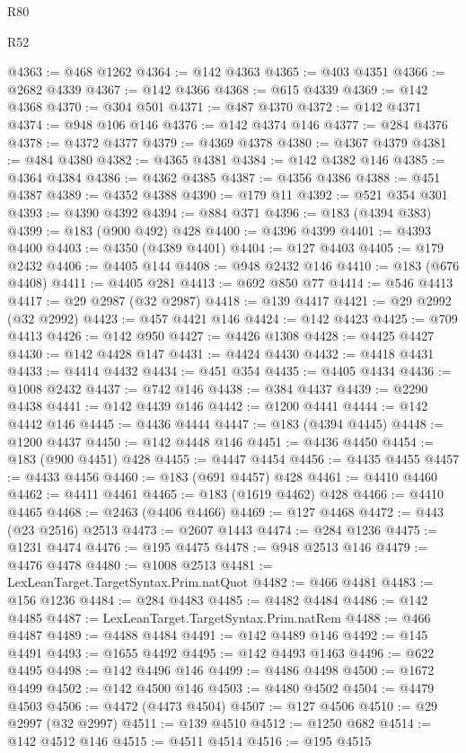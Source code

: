 \begin{lexlean}{R80}
\begin{lexlean}{R52}
\begin{coremodule}
{{{{{{{{{{{{{{{{{{{{{{{{{{{{{{{{{{{{{{{{{{{{{{{{{{{{{{{{{{{{{{{{{{{{{{{{{{{{{{{{{{{{{{{{{{{{{{{{{{{{{{{{{{{{{{{{{{{{{{{{{{{{{{{{{{{{{{{{{{{{{{{{{{{{{{{{{{{{{{{{{{{{{{{{{{{{{{{{{{{{{{{{{{{{{{{{{{{{{{@4363 := @468 @1262
@4364 := @142 @4363
@4365 := @403 @4351
@4366 := @2682 @4339
@4367 := @142 @4366
@4368 := @615 @4339
@4369 := @142 @4368
@4370 := @304 @501
@4371 := @487 @4370
@4372 := @142 @4371
@4374 := @948 @106 @146
@4376 := @142 @4374 @146
@4377 := @284 @4376
@4378 := @4372 @4377
@4379 := @4369 @4378
@4380 := @4367 @4379
@4381 := @484 @4380
@4382 := @4365 @4381
@4384 := @142 @4382 @146
@4385 := @4364 @4384
@4386 := @4362 @4385
@4387 := @4356 @4386
@4388 := @451 @4387
@4389 := @4352 @4388
@4390 := @179 @11
@4392 := @521 @354 @301
@4393 := @4390 @4392
@4394 := @884 @371
@4396 := @183 (@4394 @383)
@4399 := @183 (@900 @492) @428
@4400 := @4396 @4399
@4401 := @4393 @4400
@4403 := @4350 (@4389 @4401)
@4404 := @127 @4403
@4405 := @179 @2432
@4406 := @4405 @144
@4408 := @948 @2432 @146
@4410 := @183 (@676 @4408)
@4411 := @4405 @281
@4413 := @692 @850 @77
@4414 := @546 @4413
@4417 := @29 @2987 (@32 @2987)
@4418 := @139 @4417
@4421 := @29 @2992 (@32 @2992)
@4423 := @457 @4421 @146
@4424 := @142 @4423
@4425 := @709 @4413
@4426 := @142 @950
@4427 := @4426 @1308
@4428 := @4425 @4427
@4430 := @142 @4428 @147
@4431 := @4424 @4430
@4432 := @4418 @4431
@4433 := @4414 @4432
@4434 := @451 @354
@4435 := @4405 @4434
@4436 := @1008 @2432
@4437 := @742 @146
@4438 := @384 @4437
@4439 := @2290 @4438
@4441 := @142 @4439 @146
@4442 := @1200 @4441
@4444 := @142 @4442 @146
@4445 := @4436 @4444
@4447 := @183 (@4394 @4445)
@4448 := @1200 @4437
@4450 := @142 @4448 @146
@4451 := @4436 @4450
@4454 := @183 (@900 @4451) @428
@4455 := @4447 @4454
@4456 := @4435 @4455
@4457 := @4433 @4456
@4460 := @183 (@691 @4457) @428
@4461 := @4410 @4460
@4462 := @4411 @4461
@4465 := @183 (@1619 @4462) @428
@4466 := @4410 @4465
@4468 := @2463 (@4406 @4466)
@4469 := @127 @4468
@4472 := @443 (@23 @2516) @2513
@4473 := @2607 @1443
@4474 := @284 @1236
@4475 := @1231 @4474
@4476 := @195 @4475
@4478 := @948 @2513 @146
@4479 := @4476 @4478
@4480 := @1008 @2513
@4481 := LexLeanTarget.TargetSyntax.Prim.natQuot
@4482 := @466 @4481
@4483 := @156 @1236
@4484 := @284 @4483
@4485 := @4482 @4484
@4486 := @142 @4485
@4487 := LexLeanTarget.TargetSyntax.Prim.natRem
@4488 := @466 @4487
@4489 := @4488 @4484
@4491 := @142 @4489 @146
@4492 := @145 @4491
@4493 := @1655 @4492
@4495 := @142 @4493 @1463
@4496 := @622 @4495
@4498 := @142 @4496 @146
@4499 := @4486 @4498
@4500 := @1672 @4499
@4502 := @142 @4500 @146
@4503 := @4480 @4502
@4504 := @4479 @4503
@4506 := @4472 (@4473 @4504)
@4507 := @127 @4506
@4510 := @29 @2997 (@32 @2997)
@4511 := @139 @4510
@4512 := @1250 @682
@4514 := @142 @4512 @146
@4515 := @4511 @4514
@4516 := @195 @4515
}}}}}}}}}}}}}}}}}}}}}}}}}}}}}}}}}}}}}}}}}}}}}}}}}}}}}}}}}}}}}}}}}}}}}}}}}}}}}}}}}}}}}}}}}}}}}}}}}}}}}}}}}}}}}}}}}}}}}}}}}}}}}}}}}}}}}}}}}}}}}}}}}}}}}}}}}}}}}}}}}}}}}}}}}}}}}}}}}}}}}}}}}}}}}}}}}}}}}}
\end{coremodule}
\end{lexlean}
\end{lexlean}
